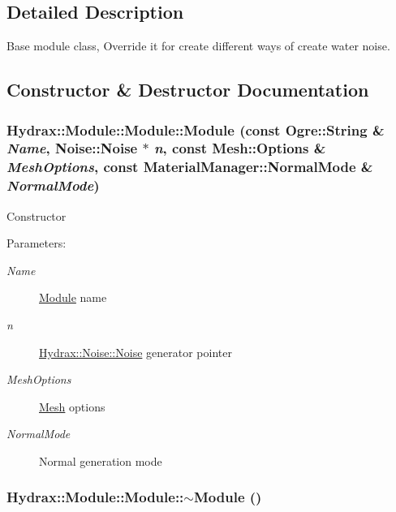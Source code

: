\subsection{Detailed Description}
Base module class, Override it for create different ways of create water noise. 

\subsection{Constructor \& Destructor Documentation}
\hypertarget{class_hydrax_1_1_module_1_1_module_b82e857eb19eac9c9091097909f3d566}{
\subsubsection[{Module}]{\setlength{\rightskip}{0pt plus 5cm}Hydrax::Module::Module::Module (const Ogre::String \& {\em Name}, \/  {\bf Noise::Noise} $\ast$ {\em n}, \/  const {\bf Mesh::Options} \& {\em MeshOptions}, \/  const {\bf MaterialManager::NormalMode} \& {\em NormalMode})}}
\label{class_hydrax_1_1_module_1_1_module_b82e857eb19eac9c9091097909f3d566}


Constructor \begin{Desc}
\item[Parameters:]
\begin{description}
\item[{\em Name}]\hyperlink{class_hydrax_1_1_module_1_1_module}{Module} name \item[{\em n}]\hyperlink{class_hydrax_1_1_noise_1_1_noise}{Hydrax::Noise::Noise} generator pointer \item[{\em MeshOptions}]\hyperlink{class_hydrax_1_1_mesh}{Mesh} options \item[{\em NormalMode}]Normal generation mode \end{description}
\end{Desc}
\hypertarget{class_hydrax_1_1_module_1_1_module_0490f405b7150266765fb44ad1aefa8c}{
\subsubsection[{$\sim$Module}]{\setlength{\rightskip}{0pt plus 5cm}Hydrax::Module::Module::$\sim$Module ()}}
\label{class_hydrax_1_1_module_1_1_module_0490f405b7150266765fb44ad1aefa8c}


